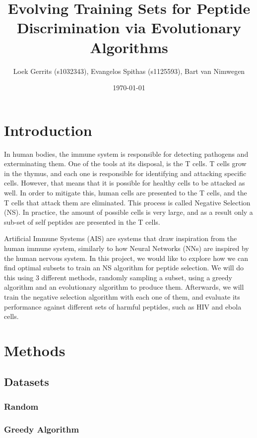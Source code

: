 \documentclass{article}
\title{Evolving Training Sets for Peptide Discrimination via Evolutionary Algorithms}
\author{Loek Gerrits (s1032343), Evangelos Spithas (s1125593), Bart van Nimwegen}
\date{\today}
\begin{document}
 

\maketitle

\section{Introduction}
In human bodies, the immune system is responsible for detecting pathogens and exterminating them. 
One of the tools at its disposal, is the T cells. T cells grow in the thymus, and each one is responsible for
identifying and attacking specific cells. However, that means that it is possible for healthy cells to be
attacked as well. In order to mitigate this, human cells are presented to the T cells, and the T cells that attack them 
are eliminated. This process is called Negative Selection (NS). In practice, the amount of possible cells is very large, and as a result only a sub-set of self peptides are presented
in the T cells. 

Artificial Immune Systems (AIS) are systems that draw inspiration from the human immune system, similarly to how Neural 
Networks (NNs) are inspired by the human nervous system. In this project, we would like to explore how we can find 
optimal subsets to train an NS algorithm for peptide selection. We will do this using 3 different methods, randomly 
sampling a subset, using a greedy algorithm and an evolutionary algorithm to produce them. Afterwards, we will train the 
negative selection algorithm with each one of them, and evaluate its performance against different sets of harmful 
peptides, such as HIV and ebola cells. 



\section{Methods}

\subsection{Datasets}

\subsubsection{Random}


\subsubsection{Greedy Algorithm}
\end{document}
